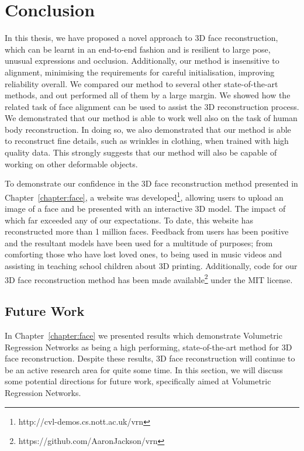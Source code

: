 \chapter{Conclusion}
\label{chapter:conclusion}



In this thesis, we have proposed a novel approach to 3D face
reconstruction, which can be learnt in an end-to-end fashion and is
resilient to large pose, unusual expressions and
occlusion. Additionally, our method is insensitive to alignment,
minimising the requirements for careful initialisation, improving
reliability overall. We compared our method to several other
state-of-the-art methods, and out performed all of them by a large
margin. We showed how the related task of face alignment can be used
to assist the 3D reconstruction process. We demonstrated that our
method is able to work well also on the task of human body
reconstruction. In doing so, we also demonstrated that our method is
able to reconstruct fine details, such as wrinkles in clothing, when
trained with high quality data. This strongly suggests that our method
will also be capable of working on other deformable objects.

To demonstrate our confidence in the 3D face reconstruction method
presented in Chapter~\ref{chapter:face}, a website was
developed\footnote{http://cvl-demos.cs.nott.ac.uk/vrn}, allowing users
to upload an image of a face and be presented with an interactive 3D
model. The impact of which far exceeded any of our expectations. To
date, this website has reconstructed more than 1 million
faces. Feedback from users has been positive and the resultant models
have been used for a multitude of purposes; from comforting those who
have lost loved ones, to being used in music videos and assisting in
teaching school children about 3D printing. Additionally, code for our
3D face reconstruction method has been made
available\footnote{https://github.com/AaronJackson/vrn} under the MIT
license.

\section{Future Work}

In Chapter~\ref{chapter:face} we presented results which demonstrate
Volumetric Regression Networks as being a high performing,
state-of-the-art method for 3D face reconstruction. Despite these
results, 3D face reconstruction will continue to be an active research
area for quite some time. In this section, we will discuss some
potential directions for future work, specifically aimed at Volumetric
Regression Networks.

